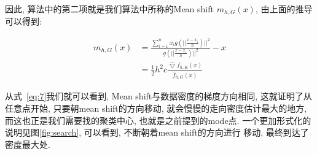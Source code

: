 \documentclass[a4paper, 11pt]{article}
\begin{document}
因此, 算法中的第二项就是我们算法中所称的Mean shift $m_{h,G}(x)$, 由上面的推导可以得到:

\begin{equation}\label{eq:7}
    \begin{split}
    m_{h,G}(x)&=\frac{\sum_{i=1}^nx_ig(||\frac{x-x_i}{h})||^2}{g(||\frac{x-x_i}{h})||^2}-x\\
    &=\frac{1}{2}h^2c\frac{\hat{\bigtriangledown }f_{h,K}(x)}{\hat{f}_{h,G}(x)}
    \end{split}
\end{equation}

从式~\ref{eq:7}我们就可以看到, Mean shift与数据密度的梯度方向相同, 这就证明了从任意点开始, 只要朝mean shift的方向移动, 就会慢慢的走向密度估计最大的地方, 而这也正是我们需要找的聚类中心, 也就是之前提到的mode点. 一个更加形式化的说明见图\ref{fig:search}, 可以看到, 不断朝着mean shift的方向进行
移动, 最终到达了密度最大处.
\end{document}
